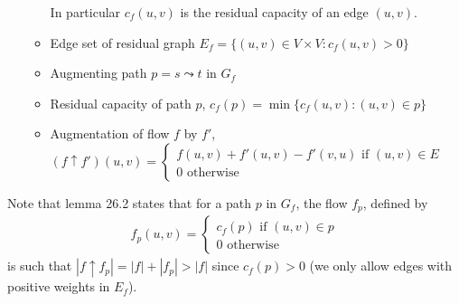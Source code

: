 \documentclass{article}
\begin{document}
\begin{itemize}
\begin{itemize}
		In particular $c_f(u,v)$ is the residual capacity of an edge $(u,v)$.
		\item Edge set of residual graph $E_f=\{(u,v)\in V\times V : c_f(u,v)>0\}$
		\item Augmenting path $p=s\leadsto t$ in $G_f$
		\item Residual capacity of path $p$, $c_f(p)=\min \{c_f(u,v) : (u,v)\in p\}$
		\item Augmentation of flow $f$ by $f'$, 
		$(f\uparrow f')(u,v)=\begin{cases}
			f(u,v) + f'(u,v) - f'(v,u) \text{ if } (u,v)\in E\\
			0 \text{ otherwise}		
		\end{cases}$
	\end{itemize}
\end{itemize}

Note that lemma 26.2 states that for a path $p$ in $G_f$, the flow  $f_p$, defined by
\begin{align*}
	f_p(u,v)=\begin{cases}
		c_f(p) \text{ if } (u,v)\in p\\
		0 \text{ otherwise}
	\end{cases}
\end{align*}
is such that $|f\uparrow f_p| = |f| + |f_p| > |f|$ since $c_f(p)>0$ (we only allow edges with positive weights in $E_f$).
\end{document}
